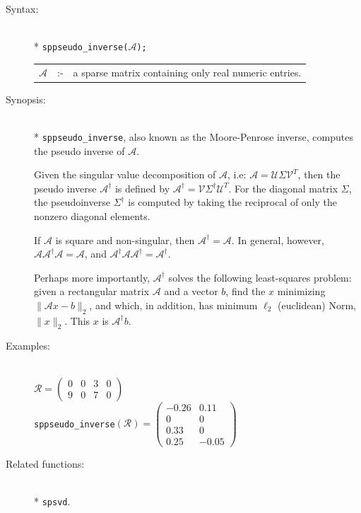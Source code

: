 \begin{description}
\item[Syntax:]\mbox{}\\*
{\tt sppseudo\_inverse($\mathcal{A}$);}\\[2mm]
\begin{tabular}{l l l}
$\mathcal{A}$ &:-& a sparse matrix containing only real numeric entries.
\end{tabular}

\item[Synopsis:]\mbox{}\\*
\texttt{sppseudo\_inverse}, also known as the Moore-Penrose inverse, computes
the pseudo inverse of $\mathcal{A}$.

Given the singular value decomposition of $\mathcal{A}$, i.e: $\mathcal{A} =
\mathcal{U}
\Sigma\mathcal{V}^T$, then the pseudo inverse $\mathcal{A}^{\dagger}$ is defined
by $\mathcal{A}^{\dagger} = \mathcal{V} \Sigma^{\dagger} \mathcal{U}^{T}$. For the
diagonal
matrix $\Sigma$, the pseudoinverse $\Sigma^{\dagger}$ is computed by taking the reciprocal
of only the nonzero diagonal elements.

If $\mathcal{A}$ is square and non-singular, then $\mathcal{A}^{\dagger} = \mathcal{A}$.
In general, however,
$\mathcal{A} \mathcal{A}^{\dagger} \mathcal{A} = \mathcal{A}$, and
$\mathcal{A}^{\dagger} \mathcal{A} \mathcal{A}^{\dagger} = \mathcal{A}^{\dagger}$.

Perhaps more importantly, $\mathcal{A}^{\dagger}$ solves the following least-squares
problem: given a rectangular matrix $\mathcal{A}$ and a vector $b$, find the
$x$ minimizing $\|\mathcal{A}x - b\|_2$,
and which, in addition, has minimum $\ell_{2}$ (euclidean) Norm, $\|x\|_2$.
This $x$ is $\mathcal{A}^{\dagger} b$.

\item[Examples:]\mbox{}\\
\(\mathcal{R} = \begin{pmatrix} 0 & 0 & 3 & 0 \\ 9 & 0 & 7 & 0 \end{pmatrix}\) \\[2mm]
\texttt{sppseudo\_inverse}\((\mathcal{R}) =
        \begin{pmatrix} -0.26 & 0.11 \\ 0 & 0 \\ 0.33 & 0 \\ 0.25 & -0.05 \end{pmatrix}\)

\item[Related functions:]\mbox{}\\*
 \texttt{spsvd}.
\end{description}

